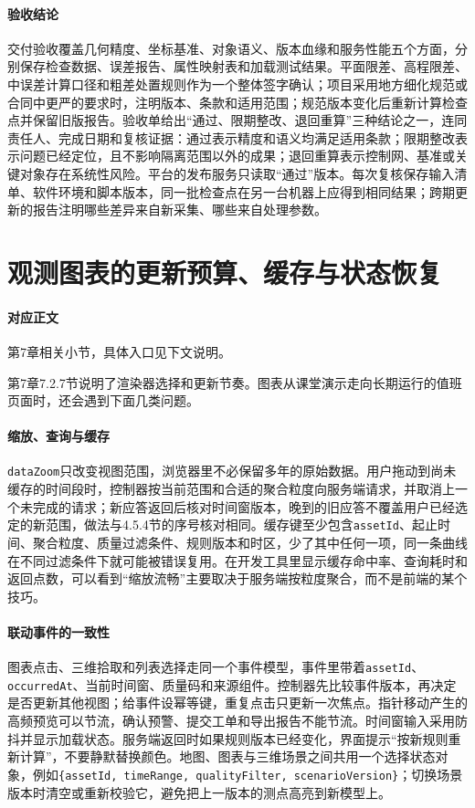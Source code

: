 \paragraph{验收结论}交付验收覆盖几何精度、坐标基准、对象语义、版本血缘和服务性能五个方面，分别保存检查数据、误差报告、属性映射表和加载测试结果。平面限差、高程限差、中误差计算口径和粗差处置规则作为一个整体签字确认；项目采用地方细化规范或合同中更严的要求时，注明版本、条款和适用范围；规范版本变化后重新计算检查点并保留旧版报告。验收单给出“通过、限期整改、退回重算”三种结论之一，连同责任人、完成日期和复核证据：通过表示精度和语义均满足适用条款；限期整改表示问题已经定位，且不影响隔离范围以外的成果；退回重算表示控制网、基准或关键对象存在系统性风险。平台的发布服务只读取“通过”版本。每次复核保存输入清单、软件环境和脚本版本，同一批检查点在另一台机器上应得到相同结果；跨期更新的报告注明哪些差异来自新采集、哪些来自处理参数。



\section{观测图表的更新预算、缓存与状态恢复}\label{app:ext-ch07-chart-runtime}

\paragraph{对应正文}第7章相关小节，具体入口见下文说明。

第7章7.2.7节说明了渲染器选择和更新节奏。图表从课堂演示走向长期运行的值班页面时，还会遇到下面几类问题。

\paragraph{缩放、查询与缓存}\texttt{dataZoom}只改变视图范围，浏览器里不必保留多年的原始数据。用户拖动到尚未缓存的时间段时，控制器按当前范围和合适的聚合粒度向服务端请求，并取消上一个未完成的请求；新应答返回后核对时间窗版本，晚到的旧应答不覆盖用户已经选定的新范围，做法与4.5.4节的序号核对相同。缓存键至少包含\texttt{assetId}、起止时间、聚合粒度、质量过滤条件、规则版本和时区，少了其中任何一项，同一条曲线在不同过滤条件下就可能被错误复用。在开发工具里显示缓存命中率、查询耗时和返回点数，可以看到“缩放流畅”主要取决于服务端按粒度聚合，而不是前端的某个技巧。

\paragraph{联动事件的一致性}图表点击、三维拾取和列表选择走同一个事件模型，事件里带着\texttt{assetId}、\texttt{occurredAt}、当前时间窗、质量码和来源组件。控制器先比较事件版本，再决定是否更新其他视图；给事件设幂等键，重复点击只更新一次焦点。指针移动产生的高频预览可以节流，确认预警、提交工单和导出报告不能节流。时间窗输入采用防抖并显示加载状态。服务端返回时如果规则版本已经变化，界面提示“按新规则重新计算”，不要静默替换颜色。地图、图表与三维场景之间共用一个选择状态对象，例如\texttt{\{assetId, timeRange, qualityFilter, scenarioVersion\}}；切换场景版本时清空或重新校验它，避免把上一版本的测点高亮到新模型上。

